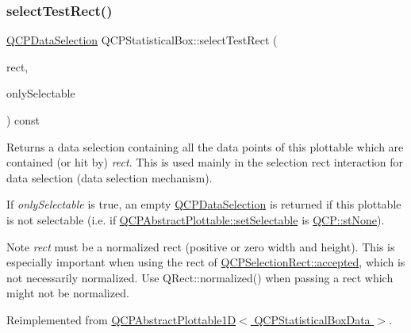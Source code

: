 \subsubsection{\texorpdfstring{select\+Test\+Rect()}{selectTestRect()}}
{\footnotesize\ttfamily \hyperlink{class_q_c_p_data_selection}{Q\+C\+P\+Data\+Selection} Q\+C\+P\+Statistical\+Box\+::select\+Test\+Rect (\begin{DoxyParamCaption}\item[{const Q\+RectF \&}]{rect,  }\item[{bool}]{only\+Selectable }\end{DoxyParamCaption}) const\hspace{0.3cm}{\ttfamily [virtual]}}





Returns a data selection containing all the data points of this plottable which are contained (or hit by) {\itshape rect}. This is used mainly in the selection rect interaction for data selection (data selection mechanism).

If {\itshape only\+Selectable} is true, an empty \hyperlink{class_q_c_p_data_selection}{Q\+C\+P\+Data\+Selection} is returned if this plottable is not selectable (i.\+e. if \hyperlink{class_q_c_p_abstract_plottable_ac238d6e910f976f1f30d41c2bca44ac3}{Q\+C\+P\+Abstract\+Plottable\+::set\+Selectable} is \hyperlink{namespace_q_c_p_ac6cb9db26a564b27feda362a438db038aa64628e338a2dd1e6f0dc84dec0b63fe}{Q\+C\+P\+::st\+None}).

\begin{DoxyNote}{Note}
{\itshape rect} must be a normalized rect (positive or zero width and height). This is especially important when using the rect of \hyperlink{class_q_c_p_selection_rect_a15a43542e1f7b953a44c260b419e6d2c}{Q\+C\+P\+Selection\+Rect\+::accepted}, which is not necessarily normalized. Use {\ttfamily Q\+Rect\+::normalized()} when passing a rect which might not be normalized. 
\end{DoxyNote}


Reimplemented from \hyperlink{class_q_c_p_abstract_plottable1_d_a22377bf6e57ab7eedbc9e489250c6ded}{Q\+C\+P\+Abstract\+Plottable1\+D$<$ Q\+C\+P\+Statistical\+Box\+Data $>$}.

\mbox{\label{class_q_c_p_statistical_box_a08a6da55822bad825ee25a8069b9b52f}} 
